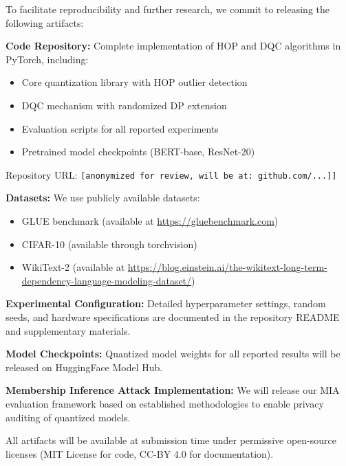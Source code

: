 \documentclass[letterpaper,twocolumn,10pt]{article}
\begin{document}
To facilitate reproducibility and further research, we commit to releasing the following artifacts:

\textbf{Code Repository:} Complete implementation of HOP and DQC algorithms in PyTorch, including:
\begin{itemize}
\item Core quantization library with HOP outlier detection
\item DQC mechanism with randomized DP extension
\item Evaluation scripts for all reported experiments
\item Pretrained model checkpoints (BERT-base, ResNet-20)
\end{itemize}
Repository URL: \texttt{[anonymized for review, will be at: github.com/...]]}

\textbf{Datasets:} We use publicly available datasets:
\begin{itemize}
\item GLUE benchmark (available at \url{https://gluebenchmark.com})
\item CIFAR-10 (available through torchvision)
\item WikiText-2 (available at \url{https://blog.einstein.ai/the-wikitext-long-term-dependency-language-modeling-dataset/})
\end{itemize}

\textbf{Experimental Configuration:} Detailed hyperparameter settings, random seeds, and hardware specifications are documented in the repository README and supplementary materials.

\textbf{Model Checkpoints:} Quantized model weights for all reported results will be released on HuggingFace Model Hub.

\textbf{Membership Inference Attack Implementation:} We will release our MIA evaluation framework based on established methodologies to enable privacy auditing of quantized models.

All artifacts will be available at submission time under permissive open-source licenses (MIT License for code, CC-BY 4.0 for documentation).

\cleardoublepage




\end{document}
